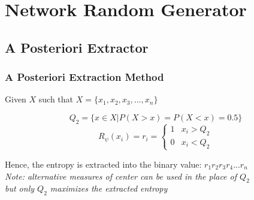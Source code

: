 \documentclass{beamer}
\begin{document}
\section{Network Random Generator}
\begin{frame}
\end{frame}
\subsection{A Posteriori Extractor}
\begin{frame}
\frametitle{A Posteriori Extraction Method}
\begin{center}
Given $X$ such that $X=\{x_1,x_2,x_3,...,x_n\}$ \\
\end{center}
$$Q_2 = \{x \in X|P(X>x)=P(X<x)=0.5\}$$
$$R_\psi(x_i) = r_i = \begin{cases} 
      1 & x_i > Q_2 \\
      0 & x_i < Q_2
   \end{cases}$$
\begin{center}
Hence, the entropy is extracted into the binary value: $r_1r_2r_3r_4...r_n$ \\
\vspace{2 em}
\textit{Note: alternative measures of center can be used in the place of $Q_2$} \\
\textit{but only $Q_2$ maximizes the extracted entropy}
\end{center}

\end{frame}
\end{document}

